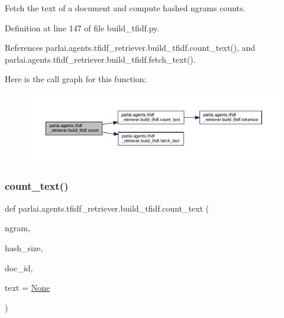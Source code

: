 \begin{DoxyVerb}Fetch the text of a document and compute hashed ngrams counts.\end{DoxyVerb}
 

Definition at line 147 of file build\+\_\+tfidf.\+py.



References parlai.\+agents.\+tfidf\+\_\+retriever.\+build\+\_\+tfidf.\+count\+\_\+text(), and parlai.\+agents.\+tfidf\+\_\+retriever.\+build\+\_\+tfidf.\+fetch\+\_\+text().

Here is the call graph for this function\+:
\nopagebreak
\begin{figure}[H]
\begin{center}
\leavevmode
\includegraphics[width=350pt]{namespaceparlai_1_1agents_1_1tfidf__retriever_1_1build__tfidf_a7fc352c82f4a875b23fec3b046027039_cgraph}
\end{center}
\end{figure}
\mbox{\label{namespaceparlai_1_1agents_1_1tfidf__retriever_1_1build__tfidf_a76bae1c966a21d123cb91949d6c8ec20}} 
\subsubsection{\texorpdfstring{count\+\_\+text()}{count\_text()}}
{\footnotesize\ttfamily def parlai.\+agents.\+tfidf\+\_\+retriever.\+build\+\_\+tfidf.\+count\+\_\+text (\begin{DoxyParamCaption}\item[{}]{ngram,  }\item[{}]{hash\+\_\+size,  }\item[{}]{doc\+\_\+id,  }\item[{}]{text = {\ttfamily \hyperlink{namespaceparlai_1_1agents_1_1tfidf__retriever_1_1build__tfidf_ad50f77b70c0e27d3304395c58e9212c4}{None}} }\end{DoxyParamCaption})}

